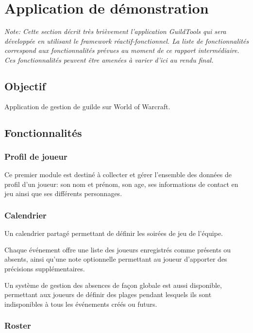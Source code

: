 \chapter{Application de démonstration}

\textit{Note: Cette section décrit très brièvement l'application GuildTools qui sera développée en utilisant le framework réactif-fonctionnel. La liste de fonctionnalités correspond aux fonctionnalités prévues au moment de ce rapport intermédiaire. Ces fonctionnalités peuvent être amenées à varier d'ici au rendu final. }

\section{Objectif}

Application de gestion de guilde sur World of Warcraft.

\section{Fonctionnalités}

	\subsection{Profil de joueur}

	Ce premier module est destiné à collecter et gérer l'ensemble des données de profil d'un joueur: son nom et prénom, son age, ses informations de contact en jeu ainsi que ses différents personnages.

	\subsection{Calendrier}
	
	Un calendrier partagé permettant de définir les soirées de jeu de l'équipe. 
	
	Chaque événement offre une liste des joueurs enregistrés comme présents ou absents, ainsi qu'une note optionnelle permettant au joueur d'apporter des précisions supplémentaires.
	
	Un système de gestion des absences de façon globale est aussi disponible, permettant aux joueurs de définir des plages pendant lesquels ils sont indisponibles à tous les événements créés ou futurs.
	
	\subsection{Roster}
	
